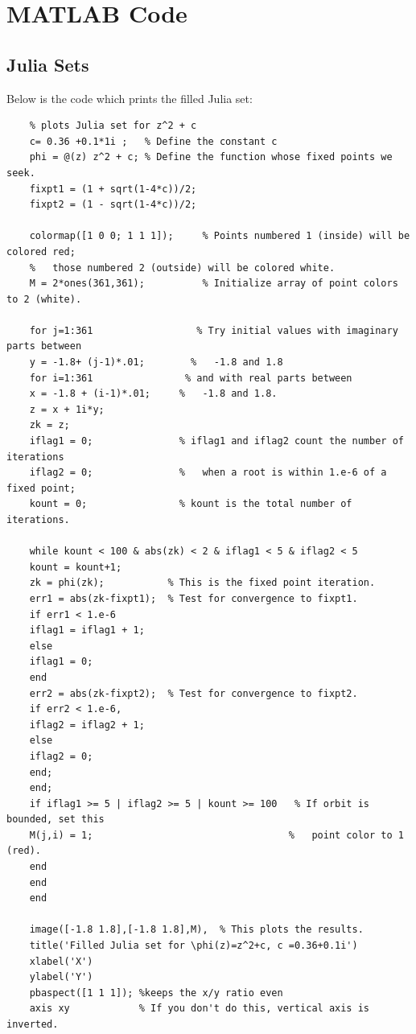 \documentclass[12pt]{article}
\begin{document}
 




\section{MATLAB Code} \label{code}
	\subsection{Julia Sets} \label{JS}
\noindent	Below is the code which prints the filled Julia set:\\
	
	\begin{verbatim}
	% plots Julia set for z^2 + c
	c= 0.36 +0.1*1i ;   % Define the constant c
	phi = @(z) z^2 + c; % Define the function whose fixed points we seek.
	fixpt1 = (1 + sqrt(1-4*c))/2;
	fixpt2 = (1 - sqrt(1-4*c))/2;
	
	colormap([1 0 0; 1 1 1]);     % Points numbered 1 (inside) will be colored red;
	%   those numbered 2 (outside) will be colored white.
	M = 2*ones(361,361);          % Initialize array of point colors to 2 (white).
	
	for j=1:361                  % Try initial values with imaginary parts between
	y = -1.8+ (j-1)*.01;        %   -1.8 and 1.8
	for i=1:361                % and with real parts between
	x = -1.8 + (i-1)*.01;     %   -1.8 and 1.8.
	z = x + 1i*y;             
	zk = z;
	iflag1 = 0;               % iflag1 and iflag2 count the number of iterations
	iflag2 = 0;               %   when a root is within 1.e-6 of a fixed point;
	kount = 0;                % kount is the total number of iterations.
	
	while kount < 100 & abs(zk) < 2 & iflag1 < 5 & iflag2 < 5
	kount = kount+1;
	zk = phi(zk);           % This is the fixed point iteration.
	err1 = abs(zk-fixpt1);  % Test for convergence to fixpt1.
	if err1 < 1.e-6
	iflag1 = iflag1 + 1;
	else
	iflag1 = 0;
	end
	err2 = abs(zk-fixpt2);  % Test for convergence to fixpt2.
	if err2 < 1.e-6,
	iflag2 = iflag2 + 1;
	else
	iflag2 = 0;
	end;
	end;
	if iflag1 >= 5 | iflag2 >= 5 | kount >= 100   % If orbit is bounded, set this
	M(j,i) = 1;                                  %   point color to 1 (red).
	end
	end
	end
	
	image([-1.8 1.8],[-1.8 1.8],M),  % This plots the results.
	title('Filled Julia set for \phi(z)=z^2+c, c =0.36+0.1i')
	xlabel('X')
	ylabel('Y')
	pbaspect([1 1 1]); %keeps the x/y ratio even
	axis xy            % If you don't do this, vertical axis is inverted.
	\end{verbatim}
	
\end{document}
